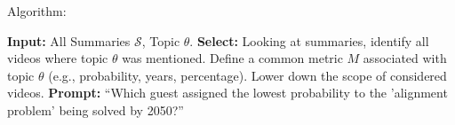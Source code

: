 \documentclass[11pt]{article}
\begin{document}
Algorithm:
\begin{algorithmic}[1]
\State \textbf{Input:} All Summaries $\mathcal{S}$, Topic $\theta$.
\State \textbf{Select:} Looking at summaries, identify all videos where topic $\theta$ was mentioned. Define a common metric $M$ associated with topic $\theta$ (e.g., probability, years, percentage). Lower down the scope of considered videos.
\State \textbf{Prompt:} ``Which guest assigned the lowest probability to the 'alignment problem' being solved by 2050?''
\end{algorithmic}





\end{document}
